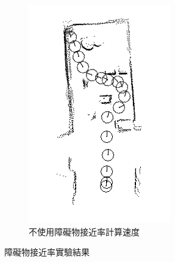 \begin{figure}[h!]
\begin{subfigure}[t]{0.48\textwidth}
	\end{subfigure}
	\begin{subfigure}[t]{0.48\textwidth}
		\includegraphics[width=\textwidth]{figures/experiments/path_NoOARComp}
		\caption{不使用障礙物接近率計算速度}
		\label{f:exp:NoOARComp}
	\end{subfigure}
	\caption{障礙物接近率實驗結果}
\end{figure}

